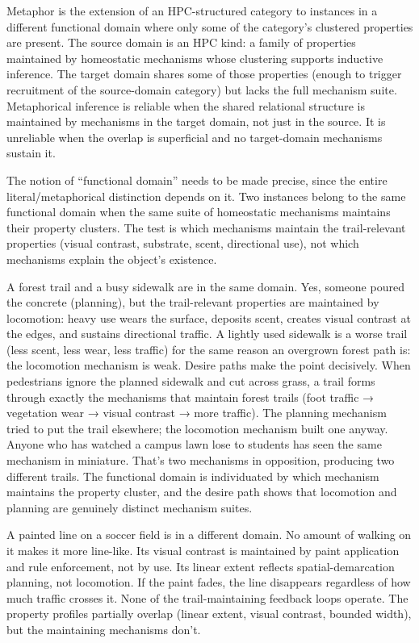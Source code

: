 \documentclass[12pt]{article}
\begin{document}
Metaphor is the extension of an HPC-structured category to instances in a different functional domain where only some of the category's clustered properties are present. The source domain is an HPC kind: a family of properties maintained by homeostatic mechanisms whose clustering supports inductive inference. The target domain shares some of those properties (enough to trigger recruitment of the source-domain category) but lacks the full mechanism suite. Metaphorical inference is reliable when the shared relational structure is maintained by mechanisms in the target domain, not just in the source. It is unreliable when the overlap is superficial and no target-domain mechanisms sustain it.

The notion of \enquote{functional domain} needs to be made precise, since the entire literal/metaphorical distinction depends on it. Two instances belong to the same functional domain when the same suite of homeostatic mechanisms maintains their property clusters. The test is which mechanisms maintain the trail-relevant properties (visual contrast, substrate, scent, directional use), not which mechanisms explain the object's existence.

A forest trail and a busy sidewalk are in the same domain. Yes, someone poured the concrete (planning), but the trail-relevant properties are maintained by locomotion: heavy use wears the surface, deposits scent, creates visual contrast at the edges, and sustains directional traffic. A lightly used sidewalk is a worse trail (less scent, less wear, less traffic) for the same reason an overgrown forest path is: the locomotion mechanism is weak. Desire paths make the point decisively. When pedestrians ignore the planned sidewalk and cut across grass, a trail forms through exactly the mechanisms that maintain forest trails (foot traffic → vegetation wear → visual contrast → more traffic). The planning mechanism tried to put the trail elsewhere; the locomotion mechanism built one anyway. Anyone who has watched a campus lawn lose to students has seen the same mechanism in miniature. That's two mechanisms in opposition, producing two different trails. The functional domain is individuated by which mechanism maintains the property cluster, and the desire path shows that locomotion and planning are genuinely distinct mechanism suites.

A painted line on a soccer field is in a different domain. No amount of walking on it makes it more line-like. Its visual contrast is maintained by paint application and rule enforcement, not by use. Its linear extent reflects spatial-demarcation planning, not locomotion. If the paint fades, the line disappears regardless of how much traffic crosses it. None of the trail-maintaining feedback loops operate. The property profiles partially overlap (linear extent, visual contrast, bounded width), but the maintaining mechanisms don't.
\end{document}
